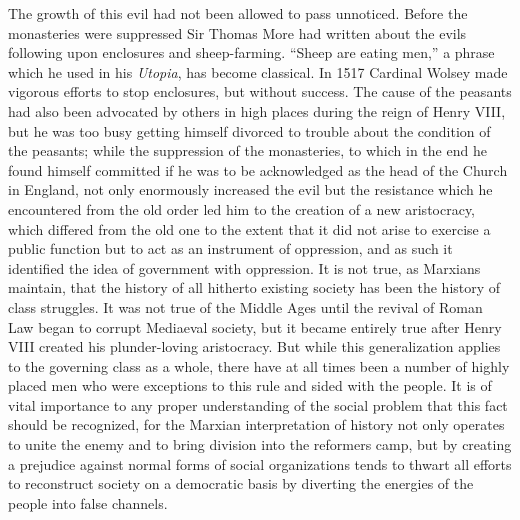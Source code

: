 \documentclass{book}
\begin{document}
The growth of this evil had not been allowed to pass unnoticed. Before the monasteries were suppressed Sir Thomas More had written about the evils following upon enclosures and sheep-farming. “Sheep are eating men,” a phrase which he used in his \emph{Utopia}, has become classical. In 1517 Cardinal Wolsey made vigorous efforts to stop enclosures, but without success. The cause of the peasants had also been advocated by others in high places during the reign of Henry VIII, but he was too busy getting himself divorced to trouble about the condition of the peasants; while the suppression of the monasteries, to which in the end he found himself committed if he was to be acknowledged as the head of the Church in England, not only enormously increased the evil but the resistance which he encountered from the old order led him to the creation of a new aristocracy, which differed from the old one to the extent that it did not arise to exercise a public function but to act as an instrument of oppression, and as such it identified the idea of government with oppression. It is not true, as Marxians maintain, that the history of all hitherto existing society has been the history of class struggles. It was not true of the Middle Ages until the revival of Roman Law began to corrupt Mediaeval society, but it became entirely true after Henry VIII created his plunder-loving aristocracy. But while this generalization applies to the governing class as a whole, there have at all times been a number of highly placed men who were exceptions to this rule and sided with the people. It is of vital importance to any proper understanding of the social problem that this fact should be recognized, for the Marxian interpretation of history not only operates to unite the enemy and to bring division into the reformers camp, but by creating a prejudice against normal forms of social organizations tends to thwart all efforts to reconstruct society on a democratic basis by diverting the energies of the people into false channels.
\end{document}
